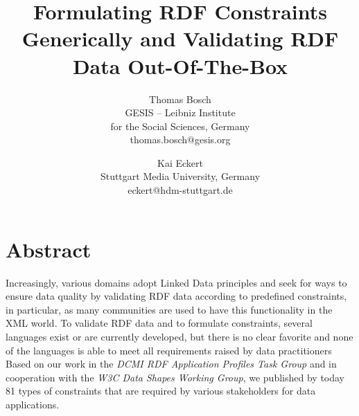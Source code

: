\documentclass[a4paper,fontsize=11pt]{scrartcl}
\date{}
\newcommand{\tb}[1]{\todo[size=\small, color=green!40]{\textbf{Thomas:} #1}}
\newcommand{\ms}[1]{\texttt{#1}}
\begin{document}
\title{\vspace{-1em}Formulating RDF Constraints Generically and Validating RDF Data Out-Of-The-Box}

\author{Thomas Bosch\\GESIS – Leibniz Institute \\for the Social Sciences, Germany\\thomas.bosch@gesis.org \and Kai Eckert\\Stuttgart Media University, Germany\\eckert@hdm-stuttgart.de}

\maketitle
\vspace{-3em}
\section*{Abstract}
Increasingly, various domains adopt Linked Data principles
and seek for ways to ensure data quality by validating RDF data according to predefined constraints,
in particular, as many communities are used to have this functionality in the XML world.
To validate RDF data and to formulate constraints, several languages exist or are currently developed,
but there is no clear favorite and none of the languages is able to meet all requirements raised by data practitioners
Based on our work in the \emph{DCMI RDF Application Profiles Task Group} and in cooperation with the \emph{W3C Data Shapes Working Group}, 
we published by today 81 types of constraints that are required by various stakeholders for data applications.
\end{document}

